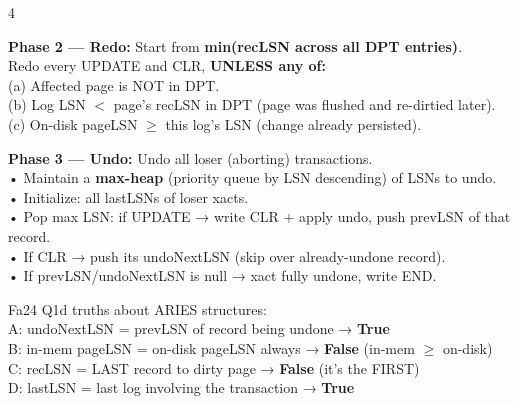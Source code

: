 \documentclass[8pt,letterpaper]{article}
\newcommand{\ans}[1]{\textbf{\color{blue!80!black}#1}}
\begin{document}
\begin{multicols*}{4}
\begin{greenbox}
\textbf{Phase 2 — Redo:} Start from \textbf{min(recLSN across all DPT entries)}.\\
Redo every UPDATE and CLR, \textbf{UNLESS any of:}\\
(a) Affected page is NOT in DPT.\\
(b) Log LSN $<$ page's recLSN in DPT (page was flushed and re-dirtied later).\\
(c) On-disk pageLSN $\ge$ this log's LSN (change already persisted).
\end{greenbox}

\begin{greenbox}
\textbf{Phase 3 — Undo:} Undo all loser (aborting) transactions.\\
• Maintain a \textbf{max-heap} (priority queue by LSN descending) of LSNs to undo.\\
• Initialize: all lastLSNs of loser xacts.\\
• Pop max LSN: if UPDATE → write CLR + apply undo, push prevLSN of that record.\\
• If CLR → push its undoNextLSN (skip over already-undone record).\\
• If prevLSN/undoNextLSN is null → xact fully undone, write END.
\end{greenbox}

\vspace{1pt}
\begin{center}\end{center}
\vspace{1pt}

\begin{ansbox}
Fa24 Q1d truths about ARIES structures:\\
A: undoNextLSN = prevLSN of record being undone → \ans{True}\\
B: in-mem pageLSN = on-disk pageLSN always → \ans{False} (in-mem $\ge$ on-disk)\\
C: recLSN = LAST record to dirty page → \ans{False} (it's the FIRST)\\
D: lastLSN = last log involving the transaction → \ans{True}
\end{ansbox}


\end{multicols*}
\end{document}
